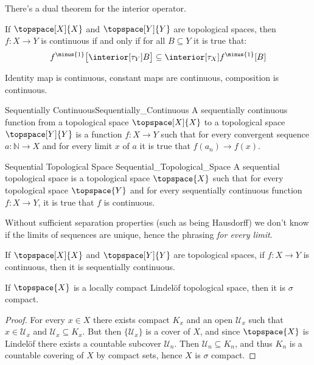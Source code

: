 \documentclass{article}                                                        %
\begin{document}
        There's a dual theorem for the interior operator.
        \begin{theorem}
            If $\topspace[X]{X}$ and $\topspace[Y]{Y}$ are topological spaces,
            then $f:X\rightarrow{Y}$ is continuous if and only if for all
            $B\subseteq{Y}$ it is true that:
            \begin{equation}
                f^{\minus{1}}\big[\interior[\tau_{Y}]{B}\big]
                \subseteq\interior[\tau_{X}]{f^{\minus{1}}[B]}
            \end{equation}
        \end{theorem}
        Identity map is continuous, constant maps are continuous, composition is
        continuous.
        \begin{fdefinition}{Sequentially Continuous}{Sequentially_Continuous}
            A sequentially continuous function from a topological space
            $\topspace[X]{X}$ to a topological space $\topspace[Y]{Y}$ is a
            function $f:X\rightarrow{Y}$ such that for every convergent sequence
            $a:\mathbb{N}\rightarrow{X}$ and for every limit $x$ of $a$ it is
            true that $f(a_{n})\rightarrow{f}(x)$.
        \end{fdefinition}
        \begin{fdefinition}{Sequential Topological Space}
                           {Sequential_Topological_Space}
            A sequential topological space is a topological space $\topspace{X}$
            such that for every topological space $\topspace{Y}$ and for every
            sequentially continuous function $f:X\rightarrow{Y}$, it is true
            that $f$ is continuous.
        \end{fdefinition}
        Without sufficient separation properties (such as being Hausdorff) we
        don't know if the limits of sequences are unique, hence the phrasing
        \textit{for every limit}.
        \begin{theorem}
            If $\topspace[X]{X}$ and $\topspace[Y]{Y}$ are topological spaces,
            if $f:X\rightarrow{Y}$ is continuous, then it is sequentially
            continuous.
        \end{theorem}
        \begin{theorem}
            If $\topspace{X}$ is a locally compact Lindel\"{o}f topological
            space, then it is $\sigma$ compact.
        \end{theorem}
        \begin{proof}
            For every $x\in{X}$ there exists compact $K_{x}$ and an open
            $\mathcal{U}_{x}$ such that $x\in\mathcal{U}_{x}$ and
            $\mathcal{U}_{x}\subseteq{K}_{x}$. But then $\{\mathcal{U}_{x}\}$ is
            a cover of $X$, and since $\topspace{X}$ is Lindel\"{o}f there
            exists a countable subcover $\mathcal{U}_{n}$. Then
            $\mathcal{U}_{n}\subseteq{K}_{n}$, and thus $K_{n}$ is a countable
            covering of $X$ by compact sets, hence $X$ is $\sigma$ compact.
        \end{proof}
\end{document}
